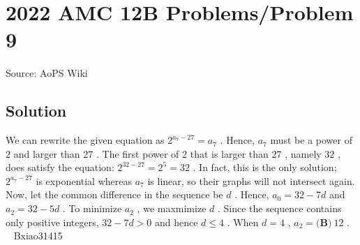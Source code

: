 \documentclass[12pt]{article}
\begin{document}
\section*{{2022 AMC 12B Problems/Problem 9}}
Source: AoPS Wiki

\subsection*{Solution}
We can rewrite the given equation as $2^{a_7-27}=a_7$ . Hence, $a_7$ must be a power of $2$ and larger than $27$ . The first power of 2 that is larger than $27$ , namely $32$ , does satisfy the equation: $2^{32 - 27} = 2^5 = 32$ . In fact, this is the only solution; $2^{a_7-27}$ is exponential whereas $a_7$ is linear, so their graphs will not intersect again. Now, let the common difference in the sequence be $d$ . Hence, $a_0 = 32 - 7d$ and $a_2 = 32 - 5d$ . To minimize $a_2$ , we maxmimize $d$ . Since the sequence contains only positive integers, $32 - 7d > 0$ and hence $d \leq 4$ . When $d = 4$ , $a_2 = \boxed{\textbf{(B)}\ 12}$ . ~ Bxiao31415
\end{document}
